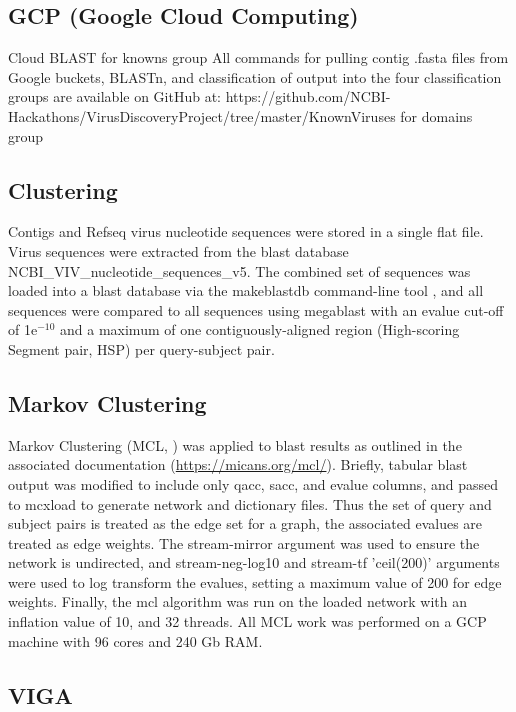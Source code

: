 \documentclass[genes, moreauthors]{Definitions/mdpi}
\begin{document}
  \subsection{GCP (Google Cloud Computing)}
  Cloud BLAST
  for knowns group
  All commands for pulling contig .fasta files from Google buckets, BLASTn, and classification of output into the four classification groups are available on GitHub at: https://github.com/NCBI-Hackathons/VirusDiscoveryProject/tree/master/KnownViruses
  for domains group

  \subsection{Clustering}
  Contigs and Refseq virus nucleotide sequences were stored in a single flat
  file. Virus sequences were extracted from the blast database
  NCBI\_VIV\_nucleotide\_sequences\_v5. The combined set of sequences was
  loaded into a blast database via the makeblastdb command-line tool
  \cite{Camacho2009}, and all sequences were compared to all sequences using
  megablast \cite{Camacho2009} with an evalue cut-off of 1e$^{-10}$ and a
  maximum of one contiguously-aligned region (High-scoring Segment pair, HSP)
  per query-subject pair.


  \subsection{Markov Clustering}
  Markov Clustering (MCL, \cite{Enright2002}) was applied to blast results as
  outlined in the associated documentation (\url{https://micans.org/mcl/}).
  Briefly, tabular blast output was modified to include only qacc, sacc, and
  evalue columns, and passed to mcxload to generate network and dictionary
  files. Thus the set of query and subject pairs is treated as the edge set for
  a graph, the associated evalues are treated as edge weights. The
  stream-mirror argument was used to ensure the network is undirected, and
  stream-neg-log10  and stream-tf 'ceil(200)' arguments were used to log
  transform the evalues, setting a maximum value of 200 for edge weights.
  Finally, the mcl algorithm was run on the loaded network with an inflation
  value of 10, and 32 threads. All MCL work was performed on a GCP machine with
  96 cores and 240 Gb RAM.

  \subsection{VIGA}
\end{document}
